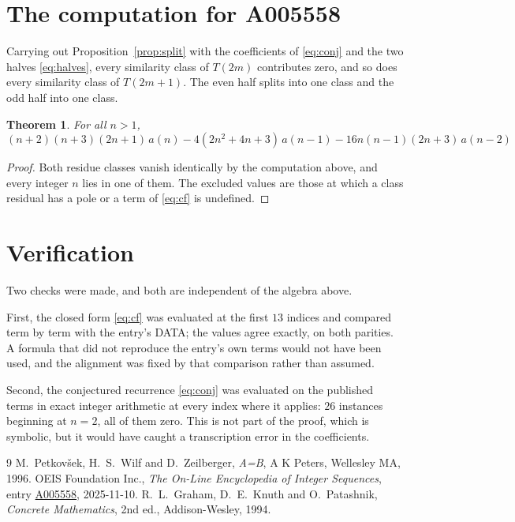 \documentclass[11pt,a4paper]{article}
\theoremstyle{plain}
\newtheorem{theorem}{Theorem}
\theoremstyle{definition}
\begin{document}
\section{The computation for A005558}

Carrying out Proposition~\ref{prop:split} with the coefficients of \eqref{eq:conj} and the
two halves \eqref{eq:halves}, every similarity class of $T(2m)$ contributes zero, and so
does every similarity class of $T(2m+1)$. The even half splits into one class
and the odd half into one class.

\begin{theorem}
For all $n> 1$,
\[
\left(n + 2\right) \left(n + 3\right) \left(2 n + 1\right)\,a(n) -  4 \left(2 n^{2} + 4 n + 3\right)\,a(n-1) -  16 n \left(n - 1\right) \left(2 n + 3\right)\,a(n-2)
\]
\end{theorem}

\begin{proof}
Both residue classes vanish identically by the computation above, and every integer $n$
lies in one of them. The excluded values are those at which a class residual has a pole or
a term of \eqref{eq:cf} is undefined.
\end{proof}

\section{Verification}

Two checks were made, and both are independent of the algebra above.

First, the closed form \eqref{eq:cf} was evaluated at the first $13$ indices and
compared term by term with the entry's DATA; the values agree exactly, on both parities. A
formula that did not reproduce the entry's own terms would not have been used, and the
alignment was fixed by that comparison rather than assumed.

Second, the conjectured recurrence \eqref{eq:conj} was evaluated on the published terms in
exact integer arithmetic at every index where it applies: $26$ instances beginning at
$n=2$, all of them zero. This is not part of the proof, which is symbolic, but it
would have caught a transcription error in the coefficients.

\begin{thebibliography}{9}
 M.~Petkov\v{s}ek, H.~S.~Wilf and D.~Zeilberger, \emph{A=B}, A K Peters,
Wellesley MA, 1996.
 OEIS Foundation Inc., \emph{The On-Line Encyclopedia of Integer Sequences},
entry \href{https://oeis.org/A005558}{A005558}, 2025-11-10.
 R.~L.~Graham, D.~E.~Knuth and O.~Patashnik, \emph{Concrete Mathematics},
2nd ed., Addison-Wesley, 1994.
\end{thebibliography}
\end{document}
